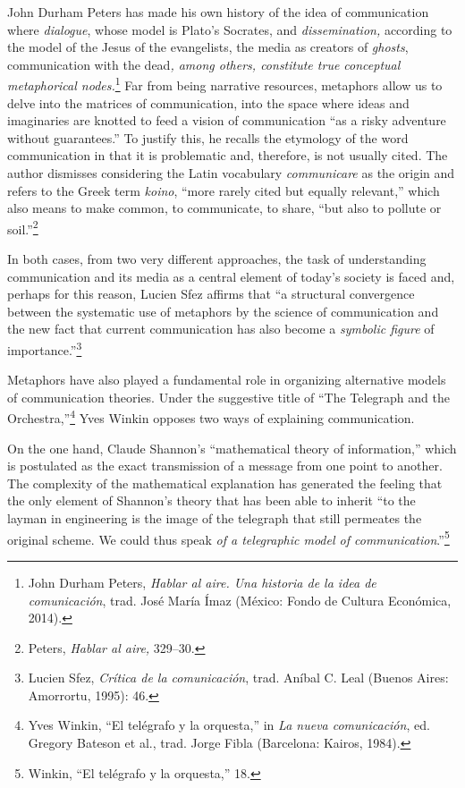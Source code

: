 \documentclass{tufte-handout}
\begin{document}
John Durham Peters has made his own history of the idea of communication
where \emph{dialogue}, whose model is Plato's Socrates, and
\emph{dissemination,} according to the model of the Jesus of the
evangelists, the media as creators of \emph{ghosts}, communication with
the dead\emph{, among others, constitute true conceptual metaphorical
nodes.}\footnote{John Durham Peters, \emph{Hablar al aire. Una historia
  de la idea de comunicación}, trad. José María Ímaz (México: Fondo de
  Cultura Económica, 2014).} Far from being narrative resources,
metaphors allow us to delve into the matrices of communication, into the
space where ideas and imaginaries are knotted to feed a vision of
communication ``as a risky adventure without guarantees.'' To justify
this, he recalls the etymology of the word communication in that it is
problematic and, therefore, is not usually cited. The author dismisses
considering the Latin vocabulary \emph{communicare} as the origin and
refers to the Greek term \emph{koino}, ``more rarely cited but equally
relevant,'' which also means to make common, to communicate, to share,
``but also to pollute or soil.''\footnote{Peters, \emph{Hablar al aire,}
  329--30.}

In both cases, from two very different approaches, the task of
understanding communication and its media as a central element of
today's society is faced and, perhaps for this reason, Lucien Sfez
affirms that ``a structural convergence between the systematic use of
metaphors by the science of communication and the new fact that current
communication has also become a \emph{symbolic figure} of
importance.''\footnote{Lucien Sfez, \emph{Crítica de la comunicación},
  trad. Aníbal C. Leal (Buenos Aires: Amorrortu, 1995): 46.}

Metaphors have also played a fundamental role in organizing alternative
models of communication theories. Under the suggestive title of ``The
Telegraph and the Orchestra,''\footnote{Yves Winkin, ``El telégrafo y la
  orquesta,'' in \emph{La nueva comunicación}, ed. Gregory Bateson et
  al., trad. Jorge Fibla (Barcelona: Kairos, 1984).} Yves Winkin opposes
two ways of explaining communication.

On the one hand, Claude Shannon's ``mathematical theory of
information,'' which is postulated as the exact transmission of a
message from one point to another. The complexity of the mathematical
explanation has generated the feeling that the only element of Shannon's
theory that has been able to inherit ``to the layman in engineering is
the image of the telegraph that still permeates the original scheme. We
could thus speak \emph{of a telegraphic model of
communication}.''\footnote{Winkin, ``El telégrafo y la orquesta,'' 18.}
\end{document}
